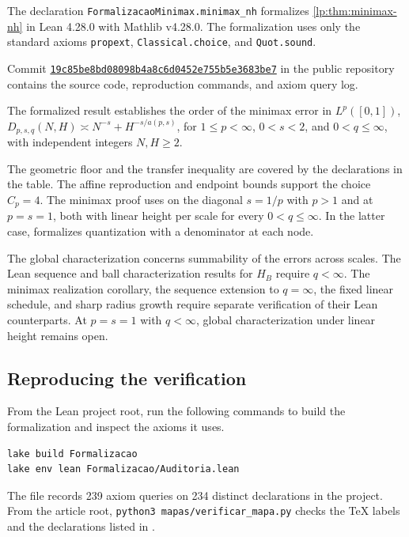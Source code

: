 \documentclass[11pt,a4paper]{article}
\begin{document}
The declaration \texttt{FormalizacaoMinimax.minimax\_nh} formalizes \cref{lp:thm:minimax-nh} in Lean 4.28.0 with Mathlib v4.28.0. The formalization uses only the standard axioms \texttt{propext}, \texttt{Classical.choice}, and \texttt{Quot.sound}.

Commit \href{https://github.com/Walc21/ARTIGO-BESOV/commit/19c85be8bd08098b4a8c6d0452e755b5e3683be7}{\texttt{19c85be8bd08098b4a8c6d0452e755b5e3683be7}} in the public repository contains the source code, reproduction commands, and axiom query log.

The formalized result establishes the order of the minimax error in $L^p([0,1])$, $D_{p,s,q}(N,H)\asymp N^{-s}+H^{-s/a(p,s)}$, for $1\le p<\infty$, $0<s<2$, and $0<q\le\infty$, with independent integers $N,H\ge2$.

The geometric floor and the transfer inequality are covered by the declarations in the table. The affine reproduction and endpoint bounds support the choice $C_p=4$. The minimax proof uses  on the diagonal $s=1/p$ with $p>1$ and  at $p=s=1$, both with linear height per scale for every $0<q\le\infty$. In the latter case,  formalizes quantization with a denominator at each node.

The global characterization concerns summability of the errors across scales. The Lean sequence and ball characterization results for $H_B$ require $q<\infty$. The minimax realization corollary, the sequence extension to $q=\infty$, the fixed linear schedule, and sharp radius growth require separate verification of their Lean counterparts. At $p=s=1$ with $q<\infty$, global characterization under linear height remains open.

\subsection{Reproducing the verification}

From the Lean project root, run the following commands to build the formalization and inspect the axioms it uses.
\begin{verbatim}
lake build Formalizacao
lake env lean Formalizacao/Auditoria.lean
\end{verbatim}
The file  records 239 axiom queries on 234 distinct declarations in the project. From the article root, \texttt{python3 mapas/verificar\_mapa.py} checks the TeX labels and the declarations listed in .

\articlereferences
\end{document}
